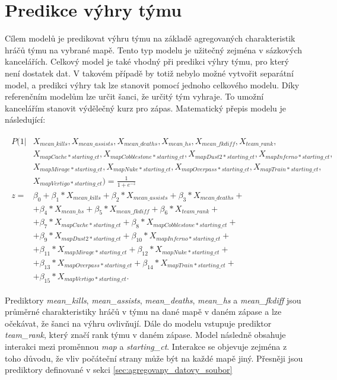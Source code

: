 \newpage
\section{Predikce výhry týmu}
Cílem modelů je predikovat výhru týmu na základě agregovaných charakteristik hráčů týmu na vybrané mapě. Tento typ modelu je užitečný zejména v sázkových kancelářích.
Celkový model je také vhodný při predikci výhry týmu, pro který není dostatek dat. V takovém případě by totiž nebylo možné vytvořit separátní model, a predikci výhry tak
lze stanovit pomocí jednoho celkového modelu. Díky referenčním modelům lze určit šanci, že určitý tým vyhraje. To umožní kancelářím stanovit výdělečný kurz pro zápas.
Matematický přepis modelu je následující:

\begin{align}
    \begin{split}
        P(1 | &X_{mean\_kills}, X_{mean\_assists}, X_{mean\_deaths}, X_{mean\_hs}, X_{mean\_fkdiff}, X_{team\_rank}, \\
              &X_{mapCache*starting\_ct}, X_{mapCobblestone*starting\_ct}, X_{mapDust2*starting\_ct}, X_{mapInferno*starting\_ct}, \\
              &X_{mapMirage*starting\_ct}, X_{mapNuke*starting\_ct}, X_{mapOverpass*starting\_ct}, X_{mapTrain*starting\_ct}, \\
              &X_{mapVertigo*starting\_ct}) = \frac{1}{1 + e^{-z}} \\
        z = &\beta_0 + \beta_1*X_{mean\_kills} + \beta_2*X_{mean\_assists} + \beta_3*X_{mean\_deaths} + \\
            &+ \beta_4*X_{mean\_hs} + \beta_5*X_{mean\_fkdiff} + \beta_6*X_{team\_rank} + \\
            &+ \beta_7*X_{mapCache*starting\_ct} + \beta_8*X_{mapCobblestone*starting\_ct} + \\
            &+ \beta_9*X_{mapDust2*starting\_ct} +\beta_{10}*X_{mapInferno*starting\_ct} + \\
            &+ \beta_{11}*X_{mapMirage*starting\_ct} + \beta_{12}*X_{mapNuke*starting\_ct} + \\
            &+ \beta_{13}*X_{mapOverpass*starting\_ct} + \beta_{14}*X_{mapTrain*starting\_ct} + \\
            &+ \beta_{15}*X_{mapVertigo*starting\_ct}.
    \end{split}
\end{align}

Prediktory \textit{mean\_kills}, \textit{mean\_assists}, \textit{mean\_deaths}, \textit{mean\_hs} a  \textit{mean\_fkdiff} jsou průměrné charakteristiky hráčů v týmu na dané mapě
v daném zápase a lze očekávat, že šanci na výhru ovlivňují. Dále do modelu vstupuje prediktor \textit{team\_rank}, který značí rank týmu v daném zápase. Model následně
obsahuje interakci mezi proměnnou \textit{map} a \textit{starting\_ct}. Interakce se objevuje zejména z toho důvodu, že vliv počáteční strany může být na každé mapě jiný.
Přesněji jsou prediktory
definované v sekci \ref{sec:agregovany_datovy_soubor}

